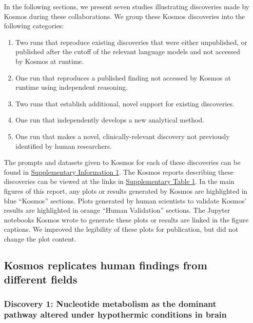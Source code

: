 \documentclass{article}
\begin{document}
In the following sections, we present seven studies illustrating discoveries made by Kosmos during these collaborations. We group these Kosmos discoveries into the following categories:
\begin{enumerate}
\item Two runs that reproduce existing discoveries that were either unpublished, or published after the cutoff of the relevant language models and not accessed by Kosmos at runtime.
\item One run that reproduces a published finding not accessed by Kosmos at runtime using independent reasoning.
\item Two runs that establish additional, novel support for existing discoveries.
\item One run that independently develops a new analytical method.
\item One run that makes a novel, clinically-relevant discovery not previously identified by human researchers.
\end{enumerate}

The prompts and datasets given to Kosmos for each of these discoveries can be found in \hyperref[sec:supp_inputs]{Supplementary Information 1}. The Kosmos reports describing these discoveries can be viewed at the links in \hyperref[tab:kosmos_reports_links]{Supplementary Table 1}. In the main figures of this report, any plots or results generated by Kosmos are highlighted in blue “Kosmos” sections. Plots generated by human scientists to validate Kosmos' results are highlighted in orange ``Human Validation'' sections. The Jupyter notebooks Kosmos wrote to generate these plots or results are linked in the figure captions. We improved the legibility of these plots for publication, but did not change the plot content.


\subsection{Kosmos replicates human findings from different fields}

\subsubsection{Discovery 1: Nucleotide metabolism as the dominant pathway altered under hypothermic conditions in brain}
\end{document}
